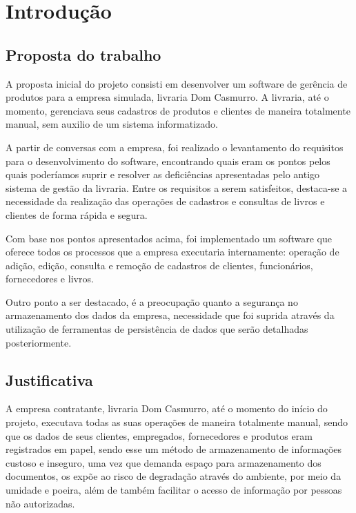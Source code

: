 \chapter{Introdução}

\section {Proposta do trabalho}

	A proposta inicial do projeto consisti em desenvolver um software de gerência de produtos para a empresa simulada, livraria Dom Casmurro. A livraria, até o momento, gerenciava seus cadastros de produtos e clientes de maneira totalmente manual, sem auxilio de um sistema informatizado.

	A partir de conversas com a empresa, foi realizado o levantamento do requisitos para o desenvolvimento do software, encontrando quais eram os pontos pelos quais poderíamos  suprir e resolver as deficiências apresentadas pelo antigo sistema de gestão da livraria. Entre os requisitos a serem satisfeitos, destaca-se a necessidade da realização das operações de cadastros e consultas de livros e clientes de forma rápida e segura. 

	Com base nos pontos apresentados acima, foi implementado um software que oferece todos os processos que a empresa executaria internamente: operação de adição, edição, consulta e remoção de cadastros de clientes, funcionários, fornecedores e livros.

	Outro ponto a ser destacado, é a preocupação quanto a segurança no armazenamento dos dados da empresa, necessidade que foi suprida através da utilização de ferramentas de persistência de dados que serão detalhadas posteriormente.
	
\section{Justificativa}

	A empresa contratante, livraria Dom Casmurro, até o momento do início do projeto, executava todas as suas operações de maneira totalmente manual, sendo que os dados de seus clientes, empregados, fornecedores e produtos eram registrados em papel, sendo esse um método de armazenamento de informações custoso e inseguro, uma vez que demanda espaço para armazenamento dos documentos, os expõe ao risco de degradação através do ambiente, por meio da umidade e poeira, além de também facilitar o acesso de informação por pessoas não autorizadas. 

